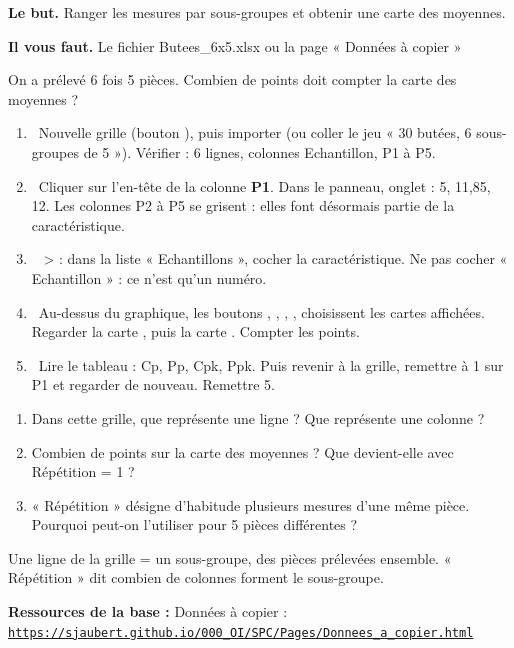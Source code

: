 \documentclass[10pt,a4paper]{article}
\begin{document}
\thispagestyle{fancy}
\begin{tcolorbox}[boite]\textbf{Le but.} Ranger les mesures par sous-groupes et obtenir une carte des moyennes.\par\textbf{Il vous faut.} Le fichier Butees\_6x5.xlsx ou la page « Données à copier »\end{tcolorbox}
\begin{tcolorbox}[pred]On a prélevé 6 fois 5 pièces. Combien de points doit compter la carte des moyennes ?\reponse\end{tcolorbox}
\begin{enumerate}[label=\textcolor{cyan}{\textbf{\arabic*.}},leftmargin=15pt,itemsep=1.5pt]
\item \tagE\ Nouvelle grille (bouton \menu{+}), puis importer  (ou coller le jeu « 30 butées, 6 sous-groupes de 5 »). Vérifier : 6 lignes, colonnes Echantillon, P1 à P5.
\item \tagE\ Cliquer sur l'en-tête de la colonne \textbf{P1}. Dans le panneau, onglet  :  5,  11,85,  12. Les colonnes P2 à P5 se grisent : elles font désormais partie de la caractéristique.
\item \tagE\  >  : dans la liste « Echantillons », cocher la caractéristique. Ne pas cocher « Echantillon » : ce n'est qu'un numéro.
\item \tagE\ Au-dessus du graphique, les boutons , , , ,  choisissent les cartes affichées. Regarder la carte , puis la carte . Compter les points.
\item \tagE\ Lire le tableau  : Cp, Pp, Cpk, Ppk. Puis revenir à la grille, remettre  à 1 sur P1 et regarder de nouveau. Remettre 5.
\end{enumerate}
\begin{enumerate}[label=\textcolor{cyan}{\textbf{Q\arabic*.}},leftmargin=22pt]
\item Dans cette grille, que représente une ligne ? Que représente une colonne ?\reponse[2]
\item Combien de points sur la carte des moyennes ? Que devient-elle avec Répétition = 1 ?\reponse[2]
\item « Répétition » désigne d'habitude plusieurs mesures d'une même pièce. Pourquoi peut-on l'utiliser pour 5 pièces différentes ?\reponse[2]
\end{enumerate}
\begin{tcolorbox}[retenir]Une ligne de la grille = un sous-groupe, des pièces prélevées ensemble. « Répétition » dit combien de colonnes forment le sous-groupe.\end{tcolorbox}
\vfill{\footnotesize\color{uimm}\textbf{Ressources de la base :} Données à copier : \href{https://sjaubert.github.io/000_OI/SPC/Pages/Donnees_a_copier.html\#butees6}{\nolinkurl{https://sjaubert.github.io/000_OI/SPC/Pages/Donnees_a_copier.html}}}
\end{document}
